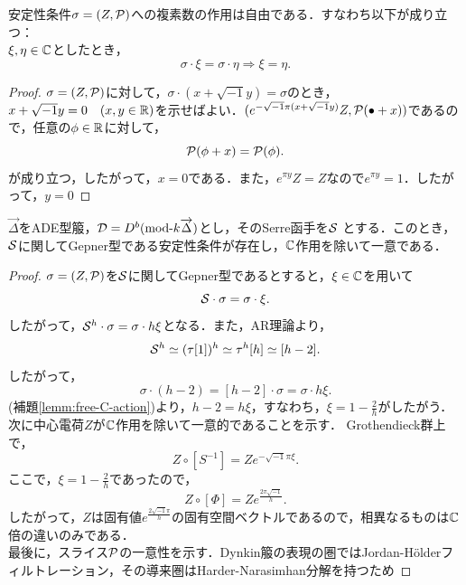 \begin{lemm}\label{lemm:free-C-action}
	安定性条件$\sigma = (Z,\P)$への複素数の作用は自由である．すなわち以下が成り立つ：\\
	$\xi,\eta\in\CC$としたとき，
	\[\sigma\cdot \xi = \sigma\cdot \eta\Longrightarrow  \xi= \eta.\]
\end{lemm}
\begin{proof}
	$\sigma = (Z,\P)$に対して，$\sigma\cdot (x+\sqrt{-1}y)= \sigma$のとき，$x+\sqrt{-1}y = 0 \quad (x,y\in\RR)$を示せばよい．$ (e^{-\sqrt{-1}\pi(x+\sqrt{-1}y)}Z,\P(\bullet + x))$であるので，任意の$\phi\in\RR$に対して，
	\[\P(\phi + x) = \P(\phi).\]
	が成り立つ，したがって，$x=0$である．また，$e^{\pi y}Z = Z$なので$e^{\pi y} =1$．したがって，$y =0$
\end{proof}

\begin{thm}
	$\overrightarrow{\Delta}$をADE型箙，$\D = D^b(\mod k\overrightarrow{\Delta})$とし，そのSerre函手を$\Serre$
	とする．このとき，$\Serre$に関してGepner型である安定性条件が存在し，$\CC$作用を除いて一意である．
\end{thm}
\begin{proof}
	$\sigma = (Z,\P)$を$\Serre$に関してGepner型であるとすると，$\xi\in\CC$を用いて
\[\Serre\cdot \sigma = \sigma\cdot\xi .\]
したがって，$\Serre^h\cdot\sigma = \sigma\cdot h\xi$となる．また，AR理論より，
	\[\Serre^h \simeq (\tau[1])^h \simeq \tau^h[h] \simeq [h-2].\]
したがって，
	\[\sigma \cdot (h-2)=[h-2]\cdot \sigma = \sigma\cdot h\xi.\]
	(補題\ref{lemm:free-C-action})より，$h-2 = h\xi$，すなわち，$\xi = 1 -\frac{2}{h}$がしたがう．\\
次に中心電荷$Z$が$\CC$作用を除いて一意的であることを示す．
Grothendieck群上で，
\[Z\circ \left[S^{-1}\right] = Ze^{-\sqrt{-1}\pi\xi}.\]
ここで，$\xi = 1 - \frac{2}{h}$であったので，
\[Z\circ \left[\Phi\right] = Ze^{\frac{2\pi\sqrt{-1}}{h}}.\]
したがって，$Z$は固有値$e^{\frac{2\sqrt{-1}\pi}{h}}$の固有空間ベクトルであるので，相異なるものは$\CC$倍の違いのみである．\\
最後に，スライス$\P$の一意性を示す．Dynkin箙の表現の圏ではJordan-H\"olderフィルトレーション，その導来圏はHarder-Narasimhan分解を持つため
\end{proof}
